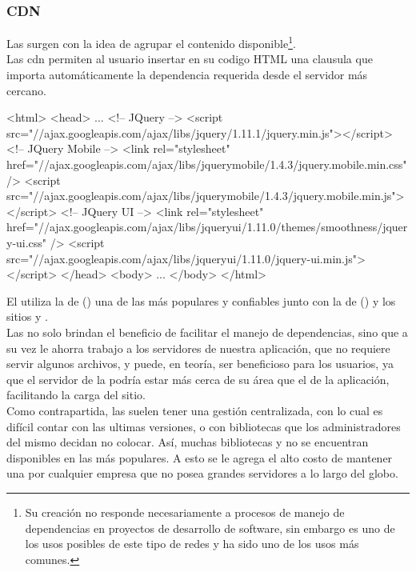 \subsubsection{CDN}
\label{susubbsec:intro:jvm_dev:cdns}

Las \cdn surgen con la idea de agrupar el contenido disponible\footnote{
	Su creación no responde necesariamente a procesos de manejo de dependencias
	en proyectos de desarrollo de software, sin embargo es uno de los usos
	posibles de este tipo de redes y ha sido uno de los usos más comunes.
}.\\
Las \gls{cdn} permiten al usuario insertar en su codigo HTML una clausula que
importa automáticamente la dependencia requerida desde el servidor más cercano.
\\
\begin{htmlcode}[caption=Dependencias agregadas mediante \cdn,
	label=code:intro:cdn:cdn_deps]
<html>
	<head>
		...
		<!-- JQuery -->
		<script src="//ajax.googleapis.com/ajax/libs/jquery/1.11.1/jquery.min.js"></script>
		<!-- JQuery Mobile -->
		<link rel="stylesheet" href="//ajax.googleapis.com/ajax/libs/jquerymobile/1.4.3/jquery.mobile.min.css" />
		<script src="//ajax.googleapis.com/ajax/libs/jquerymobile/1.4.3/jquery.mobile.min.js"></script>
		<!-- JQuery UI -->
		<link rel="stylesheet" href="//ajax.googleapis.com/ajax/libs/jqueryui/1.11.0/themes/smoothness/jquery-ui.css" />
		<script src="//ajax.googleapis.com/ajax/libs/jqueryui/1.11.0/jquery-ui.min.js"></script>
	</head>
	<body>
		...
	</body>
</html>
\end{htmlcode}

El  utiliza la \cdn de \citeauthor{GoogleCDN:ONLINE}
() una de las más populares y confiables junto con la de
\citeauthor{MicrosoftCDN:ONLINE} () y los sitios
 y .\\
Las \cdns no solo brindan el beneficio de facilitar el manejo de dependencias,
sino que a su vez le ahorra trabajo a los servidores de nuestra aplicación, que no
requiere servir algunos archivos, y puede, en teoría, ser beneficioso
para los usuarios, ya que el servidor de la \cdn podría estar más cerca de su área que
el de la aplicación, facilitando la carga del sitio.\\
Como contrapartida, las \cdns suelen tener una gestión centralizada, con lo cual es
difícil contar con las ultimas versiones, o con bibliotecas que los administradores
del mismo decidan no colocar. Así, muchas bibliotecas y \frameworks no se encuentran
disponibles en las \cdns más populares. A esto se le agrega el alto costo de mantener
una \cdn por cualquier empresa que no posea grandes servidores a lo largo del globo.

